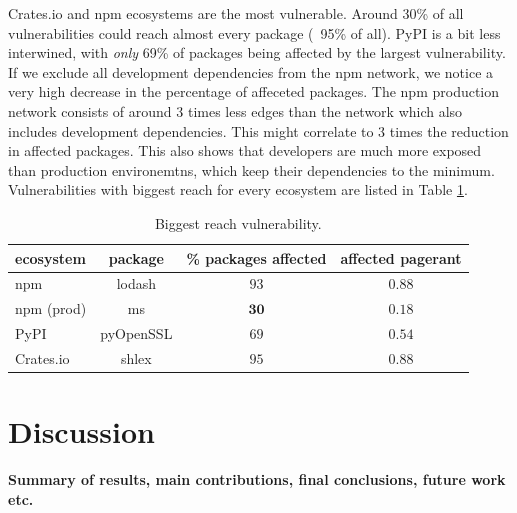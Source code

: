 \documentclass[9pt,twocolumn,twoside]{pnas-report}
\begin{document}
Crates.io and npm ecosystems are the most vulnerable.
Around 30\% of all vulnerabilities could reach almost every package (~95\% of all).
PyPI is a bit less interwined, with \textit{only} 69\% of packages being affected by the largest vulnerability.
If we exclude all development dependencies from the npm network, we notice a very high decrease in the percentage of affeceted packages.
The npm production network consists of around 3 times less edges than the network which also includes development dependencies.
This might correlate to 3 times the reduction in affected packages.
This also shows that developers are much more exposed than production environemtns, which keep their dependencies to the minimum.
Vulnerabilities with biggest reach for every ecosystem are listed in Table \ref{tab:highest_reach}.

\begin{table}[h]\centering%
	\caption{Biggest reach vulnerability.}
	\begin{tabular}{l|ccc}
		ecosystem  & package   & \% packages affected & affected pagerant \\\hline
		npm        & lodash    & $93$                 & $0.88$            \\
		npm (prod) & ms        & $\mathbf{30}$        & $\mathbf{0.18}$   \\
		PyPI       & pyOpenSSL & $69$                 & $0.54$            \\
		Crates.io  & shlex     & $95$                 & $0.88$            \\
	\end{tabular}
	\label{tab:highest_reach}
\end{table}

\section*{Discussion}

 {\bf Summary of results, main contributions, final conclusions, future work etc.}
\lipsum[1-3]
\end{document}
